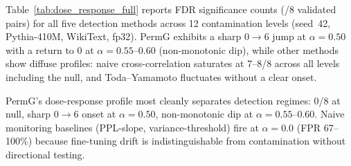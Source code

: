 Table~\ref{tab:dose_response_full} reports FDR significance counts (/8 validated pairs) for all five detection methods across 12 contamination levels (seed~42, Pythia-410M, WikiText, fp32).
PermG exhibits a sharp 0$\to$6 jump at $\alpha{=}0.50$ with a return to 0 at $\alpha{=}0.55$--$0.60$ (non-monotonic dip), while other methods show diffuse profiles: naive cross-correlation saturates at 7--8/8 across all levels including the null, and Toda--Yamamoto fluctuates without a clear onset.

\begin{table}[t]
\centering
\small
\caption{Per-method FDR significance (/8 pairs) across contamination levels (Pythia-410M, seed~42, WikiText, fp32). PermG and Diff.\ XCorr use BH-corrected FDR ($q{=}0.05$); Naive XCorr, Threshold, and TY use uncorrected $p{<}0.05$ (no FDR field in pipeline). $\alpha{=}1.0$ from Pythia-410M cross-architecture condition (same seed/domain/precision).}
\label{tab:dose_response_full}
\end{table}

PermG's dose-response profile most cleanly separates detection regimes: 0/8 at null, sharp 0$\to$6 onset at $\alpha{=}0.50$, non-monotonic dip at $\alpha{=}0.55$--$0.60$.
Naive monitoring baselines (PPL-slope, variance-threshold) fire at $\alpha{=}0.0$ (FPR 67--100\%) because fine-tuning drift is indistinguishable from contamination without directional testing.

